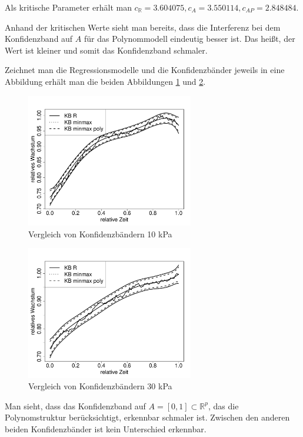 \documentclass[12pt,a4paper]{article}
\theoremstyle{definition}
\theoremstyle{definition}
\theoremstyle{definition}
\theoremstyle{definition}
\begin{document}
Als kritische Parameter erhält man $c_{\mathbb{R}} = 3.604075, c_{A} = 3.550114, c_{AP} = 2.848484 $. 

Anhand der kritischen Werte sieht man bereits, dass die Interferenz bei dem Konfidenzband auf $A$ für das Polynommodell eindeutig besser ist. Das heißt, der Wert ist kleiner und somit das Konfidenzband schmaler.

Zeichnet man die Regressionsmodelle und die Konfidenzbänder jeweils in eine Abbildung erhält man die beiden Abbildungen \ref{10kPa-method} und \ref{30kPa-method}.

\begin{figure}[H] 
  \centering
     \includegraphics[width=0.65\textwidth]{10kPa-method.pdf}
  \caption{Vergleich von Konfidenzbändern 10 kPa}
  \label{10kPa-method}
\end{figure}

\begin{figure}[H] 
  \centering
     \includegraphics[width=0.65\textwidth]{30kPa-method.pdf}
  \caption{Vergleich von Konfidenzbändern 30 kPa}
  \label{30kPa-method}
\end{figure} 

Man sieht, dass  das Konfidenzband auf $A = [0,1] \subset \mathbb{R}^{p}$, das die Polynomstruktur berücksichtigt, erkennbar schmaler ist. Zwischen den anderen beiden Konfidenzbänder ist kein Unterschied erkennbar.
\end{document}
